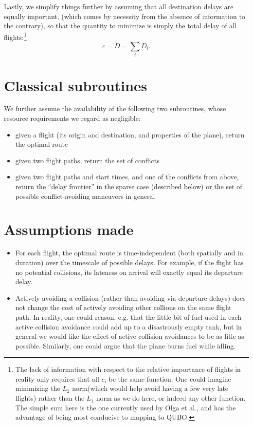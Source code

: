 \documentclass{article}
\begin{document}
Lastly, we simplify things further by assuming that all destination delays are equally important, (which comes by necessity from the absence of information to the contrary), so that the quantity to minimize is simply the total delay of all flights:\footnote{The lack of information with respect to the relative importance of flights in reality only requires that all $c_i$ be the same function. One could imagine minimizing the $L_2$ norm(which would help avoid having a few very late flights) rather than the $L_1$ norm as we do here, or indeed any other function. The simple sum here is the one currently used by Olga et al., and has the advantage of being most conducive to mapping to QUBO.}
\begin{equation*}
c = D = \sum_i D_i.
\end{equation*}

\section{Classical subroutines}
We further assume the availability of the following two subroutines, whose resource requirements we regard as negligible:
\begin{itemize}
\item given a flight (its origin and destination, and properties of the plane), return the optimal route
\item given two flight paths, return the set of conflicts
\item given two flight paths and start times, and one of the conflicts from above, return the ``delay frontier'' in the sparse case (described below) or the set of possible conflict-avoiding maneuvers in general
\end{itemize}

\section{Assumptions made}
\begin{itemize}
\item For each flight, the optimal route is time-independent (both spatially and in duration) over the timescale of possible delays.
For example, if the flight has no potential collisions, its lateness on arrival will exactly equal its departure delay.
\item Actively avoiding a collision (rather than avoiding via departure delays) does not change the cost of actively avoiding other collions on the same flight path. In reality, one could reason, e.g. that the little bit of fuel used in each active collision avoidance could add up to a disastrously empty tank, but in general we would like the effect of active collision avoidances to be as litle as possible.
Similarly, one could argue that the plane burns fuel while idling.
\end{itemize}
\end{document}
